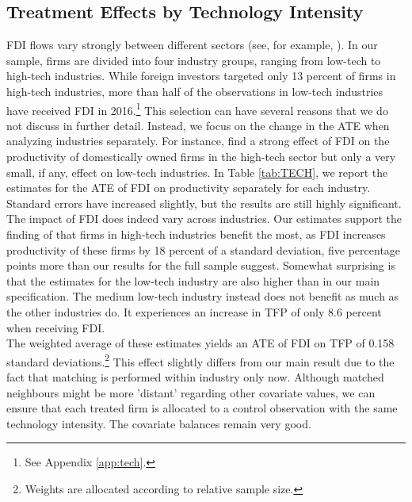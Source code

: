 \documentclass[a4paper,11pt]{scrartcl}
\begin{document}
\subsection{Treatment Effects by Technology Intensity}

FDI flows vary strongly between different sectors (see, for example, \citet{Smarzynska2004, Keller2009, Haskel2007}). In our sample, firms are divided into four industry groups, ranging from low-tech to high-tech industries. While foreign investors targeted only 13 percent of firms in high-tech industries, more than half of the observations in low-tech industries have received FDI in 2016.\footnote{See Appendix \ref{app:tech}.} 
This selection can have several reasons that we do not discuss in further detail. Instead, we focus on the change in the ATE when analyzing industries separately. For instance, \citet{Keller2009} find a strong effect of FDI on the productivity of domestically owned firms in the high-tech sector but only a very small, if any, effect on low-tech industries. In Table \ref{tab:TECH}, we report the estimates for the ATE of FDI on productivity separately for each industry. Standard errors have increased slightly, but the results are still highly significant. The impact of FDI does indeed vary across industries.  Our estimates support the finding of \citet{Keller2009} that firms in high-tech industries benefit the most, as FDI increases productivity of these firms by 18 percent of a standard deviation, five percentage points more than our results for the full sample suggest. Somewhat surprising is that the estimates for the low-tech industry are also higher than in our main specification. The medium low-tech industry instead does not benefit as much as the other industries do. It experiences an increase in TFP of only 8.6 percent when receiving FDI. 
\\
The weighted average of these estimates yields an ATE of FDI on TFP of 0.158 standard deviations.\footnote{Weights are allocated according to relative sample size.} This effect slightly differs from our main result due to the fact that matching is performed within industry only now. Although matched neighbours might be more 'distant' regarding other covariate values, we can ensure that each treated firm is allocated to a control observation with the same technology intensity. The covariate balances remain very good. 
\end{document}
